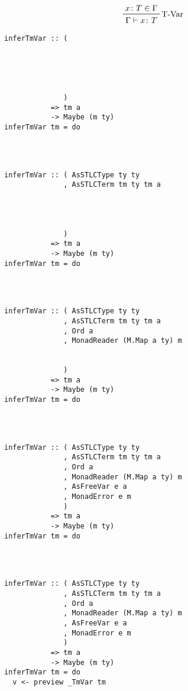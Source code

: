 \documentclass[aspectration=169]{beamer}
\begin{document}
\begin{frame}[fragile]
  \begin{displaymath}  
    \prftree[r]{T-Var}
    {x \colon T \in \Gamma}
    {\Gamma \vdash x \colon T}
  \end{displaymath}  
  \begin{overprint}
  \begin{verbatim}
inferTmVar :: (





              )
           => tm a
           -> Maybe (m ty)
inferTmVar tm = do




  \end{verbatim}  
  \begin{verbatim}
inferTmVar :: ( AsSTLCType ty ty
              , AsSTLCTerm tm ty tm a




              )
           => tm a
           -> Maybe (m ty)
inferTmVar tm = do




  \end{verbatim}  
  \begin{verbatim}
inferTmVar :: ( AsSTLCType ty ty
              , AsSTLCTerm tm ty tm a
              , Ord a
              , MonadReader (M.Map a ty) m


              )
           => tm a
           -> Maybe (m ty)
inferTmVar tm = do




  \end{verbatim}  
  \begin{verbatim}
inferTmVar :: ( AsSTLCType ty ty
              , AsSTLCTerm tm ty tm a
              , Ord a
              , MonadReader (M.Map a ty) m
              , AsFreeVar e a
              , MonadError e m
              )
           => tm a
           -> Maybe (m ty)
inferTmVar tm = do




  \end{verbatim}  
  \begin{verbatim}
inferTmVar :: ( AsSTLCType ty ty
              , AsSTLCTerm tm ty tm a
              , Ord a
              , MonadReader (M.Map a ty) m
              , AsFreeVar e a
              , MonadError e m
              )
           => tm a
           -> Maybe (m ty)
inferTmVar tm = do
  v <- preview _TmVar tm




\end{verbatim}
\end{overprint}
\end{frame}
\end{document}
